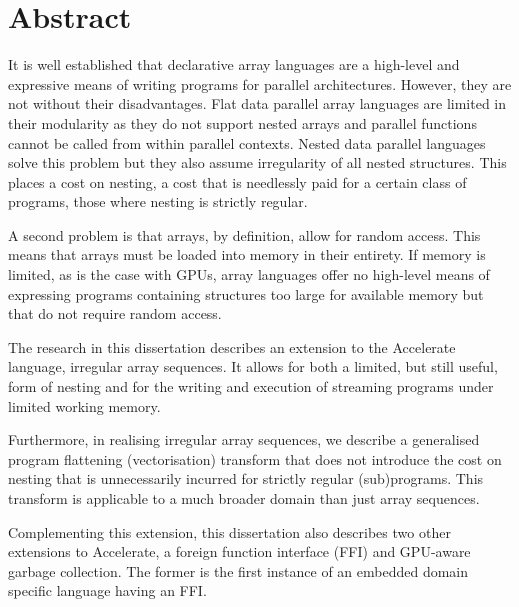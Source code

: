 \chapter{Abstract}

It is well established that declarative array languages are a high-level and expressive means of writing programs for parallel architectures. However, they are not without their disadvantages. Flat data parallel array languages are limited in their modularity as they do not support nested arrays and parallel functions cannot be called from within parallel contexts. Nested data parallel languages solve this problem but they also assume irregularity of all nested structures. This places a cost on nesting, a cost that is needlessly paid for a certain class of programs, those where nesting is strictly regular.

A second problem is that arrays, by definition, allow for random access. This means that arrays must be loaded into memory in their entirety. If memory is limited, as is the case with GPUs, array languages offer no high-level means of expressing programs containing structures too large for available memory but that do not require random access.

The research in this dissertation describes an extension to the Accelerate language, irregular array sequences. It allows for both a limited, but still useful, form of nesting and for the writing and execution of streaming programs under limited working memory.

Furthermore, in realising irregular array sequences, we describe a generalised program flattening (vectorisation) transform that does not introduce the cost on nesting that is unnecessarily incurred for strictly regular (sub)programs. This transform is applicable to a much broader domain than just array sequences.

Complementing this extension, this dissertation also describes two other extensions to Accelerate, a foreign function interface (FFI) and GPU-aware garbage collection. The former is the first instance of an embedded domain specific language having an FFI.

